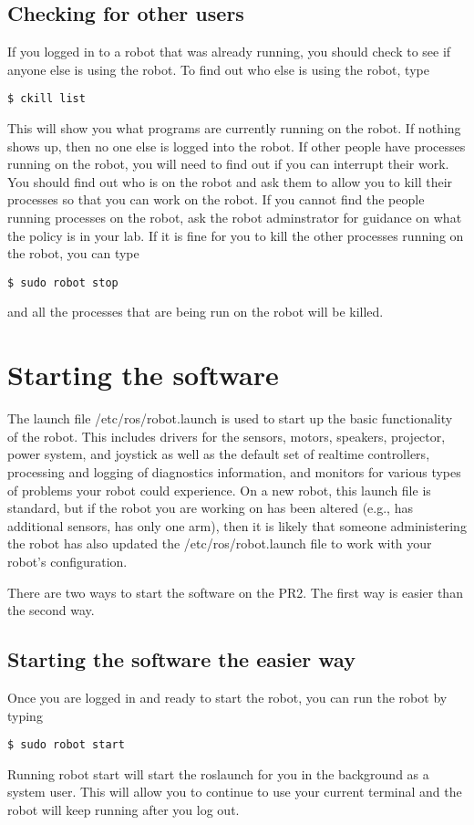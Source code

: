 \subsection{Checking for other users}
If you logged in to a robot that was already running, you should check to see if anyone else is using the robot. To 
find out who else is using the robot, type
\begin{verbatim}
$ ckill list
\end{verbatim}
This will show you what programs are currently running on the robot.  If nothing shows up, then no one else is logged into the robot. If other people have processes running on the 
robot, you will need to find out if you can interrupt their work. You should find out who is on the robot and ask them 
to allow you to kill their processes so that you can work on the robot.  If you cannot find the people running processes 
on the robot, ask the robot adminstrator for guidance on what the policy is in your lab. If it is fine for you to kill 
the other processes running on the robot, you can type
\begin{verbatim}
$ sudo robot stop
\end{verbatim}
and all the processes that are being run on the robot will be killed.

\section{Starting the software}
The launch file /etc/ros/robot.launch is used to start up the basic functionality of the robot.  This includes drivers for 
the sensors, motors, speakers, projector, power system, and joystick as well as the default set of realtime controllers, 
processing and logging of diagnostics information, and monitors for various types of problems your robot could experience.  On a new robot, this launch file is standard, but if the robot you are working on has been altered (e.g., has additional sensors, has only one arm), then it is likely that someone administering the robot has also updated the /etc/ros/robot.launch file to work with your robot's configuration.

There are two ways to start the software on the PR2. The first way is easier than the second way.
 \subsection{Starting the software the easier way}

Once you are logged in and ready to start the robot, you can run the robot by typing
\begin{verbatim}
$ sudo robot start
\end{verbatim}
Running robot start will start the roslaunch for you in the background as a system user. This will 
allow you to continue to use your current terminal and the robot will keep running after you log out.  


